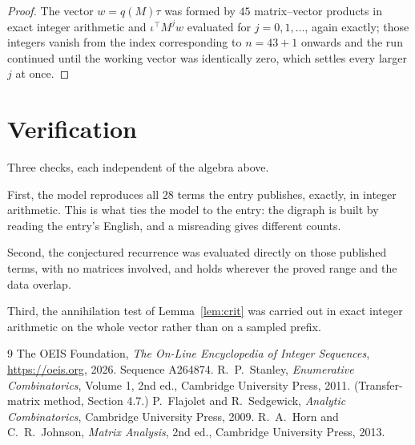 \documentclass[11pt,a4paper]{article}
\theoremstyle{plain}
\theoremstyle{definition}
\begin{document}
\begin{proof}
The vector $w=q(M)\tau$ was formed by $45$ matrix--vector products in exact integer
arithmetic and $\iota^{\!\top}M^{j}w$ evaluated for $j=0,1,\dots$, again exactly; those
integers vanish from the index corresponding to $n=43+1$ onwards and the run continued
until the working vector was identically zero, which settles every larger $j$ at once.
\end{proof}

\section{Verification}

Three checks, each independent of the algebra above.

First, the model reproduces all $28$ terms the entry publishes, exactly, in integer
arithmetic. This is what ties the model to the entry: the digraph is built by reading the
entry's English, and a misreading gives different counts.

Second, the conjectured recurrence was evaluated directly on those published terms, with no
matrices involved, and holds wherever the proved range and the data overlap.

Third, the annihilation test of Lemma~\ref{lem:crit} was carried out in exact integer
arithmetic on the whole vector rather than on a sampled prefix.

\begin{thebibliography}{9}
 The OEIS Foundation, \emph{The On-Line Encyclopedia of Integer
Sequences}, \url{https://oeis.org}, 2026. Sequence A264874.
 R.~P.~Stanley, \emph{Enumerative Combinatorics}, Volume 1, 2nd ed.,
Cambridge University Press, 2011. (Transfer-matrix method, Section 4.7.)
 P.~Flajolet and R.~Sedgewick, \emph{Analytic Combinatorics}, Cambridge
University Press, 2009.
 R.~A.~Horn and C.~R.~Johnson, \emph{Matrix Analysis}, 2nd ed., Cambridge
University Press, 2013.
\end{thebibliography}
\end{document}
